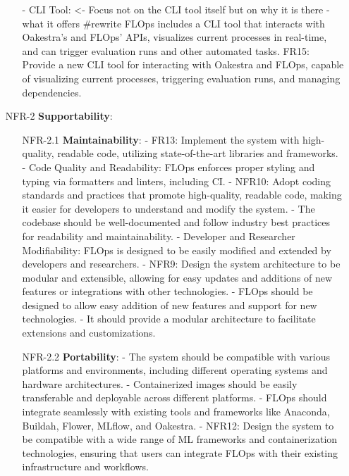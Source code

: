 \begin{itemize}
\begin{itemize}
            - CLI Tool: <- Focus not on the CLI tool itself but on why it is there - what it offers #rewrite
                FLOps includes a CLI tool that interacts with Oakestra’s and FLOps’ APIs, visualizes current processes in real-time, and can trigger evaluation runs and other automated tasks.
                FR15: Provide a new CLI tool for interacting with Oakestra and FLOps, capable of visualizing current processes, triggering evaluation runs, and managing dependencies.
        \end{itemize}
    \item [NFR-2] {\textbf{Supportability}}:
        \begin{itemize}
        \item [NFR-2.1] {\textbf{Maintainability}}:
            - FR13: Implement the system with high-quality, readable code, utilizing state-of-the-art libraries and frameworks.
            - Code Quality and Readability:
                FLOps enforces proper styling and typing via formatters and linters, including CI.    
            - NFR10: Adopt coding standards and practices that promote high-quality, readable code, making it easier for developers to understand and modify the system.
            - The codebase should be well-documented and follow industry best practices for readability and maintainability.
            - Developer and Researcher Modifiability:
                FLOps is designed to be easily modified and extended by developers and researchers.
            - NFR9: Design the system architecture to be modular and extensible, allowing for easy updates and additions of new features or integrations with other technologies.
            - FLOps should be designed to allow easy addition of new features and support for new technologies.
            - It should provide a modular architecture to facilitate extensions and customizations.
        \item [NFR-2.2] {\textbf{Portability}}:
            - The system should be compatible with various platforms and environments, including different operating systems and hardware architectures.
            - Containerized images should be easily transferable and deployable across different platforms.
            - FLOps should integrate seamlessly with existing tools and frameworks like Anaconda, Buildah, Flower, MLflow, and Oakestra.
            - NFR12: Design the system to be compatible with a wide range of ML frameworks and containerization technologies, ensuring that users can integrate FLOps with their existing infrastructure and workflows.

\end{itemize}
\end{itemize}
